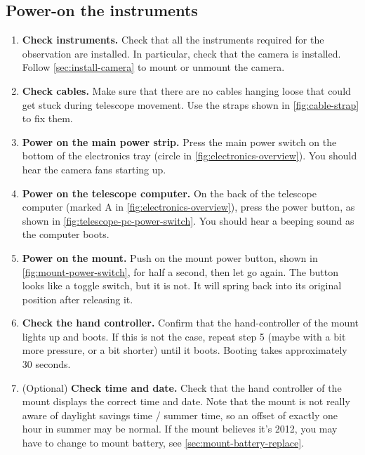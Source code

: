 \documentclass[a4paper, 11pt, fleqn]{memoir}
\begin{document}
\subsection{Power-on the instruments}

\begin{enumerate}
    \item \textbf{Check instruments.
          }
          Check that all the instruments required for the observation are installed.
          In particular, check that the camera is installed.
          Follow \cref{sec:install-camera} to mount or unmount the camera.
    \item \textbf{Check cables.}
          Make sure that there are no cables hanging loose that could get stuck during telescope movement.
          Use the straps shown in \cref{fig:cable-strap} to fix them.
    \item \textbf{Power on the main power strip.}
          Press the main power switch on the bottom of the electronics tray (circle in \cref{fig:electronics-overview}).
          You should hear the camera fans starting up.
    \item \textbf{Power on the telescope computer.}
          On the back of the telescope computer (marked A in \cref{fig:electronics-overview}), press the power button, as shown in \cref{fig:telescope-pc-power-switch}.
          You should hear a beeping sound as the computer boots.
    \item \textbf{Power on the mount.}
          Push on the mount power button, shown in \cref{fig:mount-power-switch}, for half a second, then let go again.
          The button looks like a toggle switch, but it is not.
          It will spring back into its original position after releasing it.
    \item \textbf{Check the hand controller.}
          Confirm that the hand-controller of the mount lights up and boots.
          If this is not the case, repeat step 5 (maybe with a bit more pressure, or a bit shorter) until it boots.
          Booting takes approximately 30 seconds.
    \item (Optional) \textbf{Check time and date.}
          Check that the hand controller of the mount displays the correct time and date.
          Note that the mount is not really aware of daylight savings time / summer time, so an offset of exactly one hour in summer may be normal.
          If the mount believes it's 2012, you may have to change to mount battery, see \cref{sec:mount-battery-replace}.
\end{enumerate}
\end{document}
